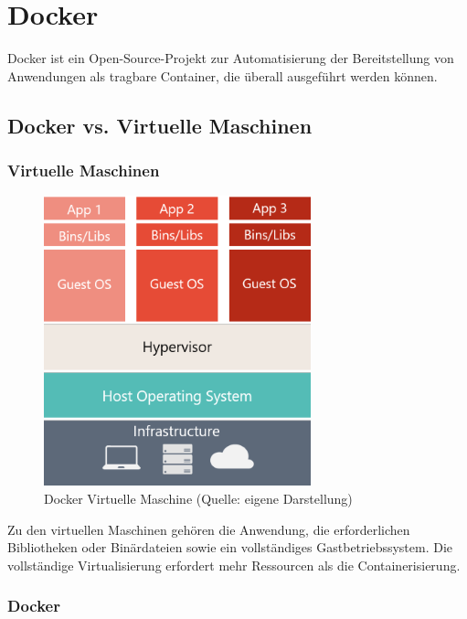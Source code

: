 \section{Docker}\label{sec:docker}

Docker ist ein Open-Source-Projekt zur Automatisierung der Bereitstellung von Anwendungen als tragbare Container, die überall ausgeführt werden können. 

\subsection{Docker vs. Virtuelle Maschinen}\label{sec:docker-vm}

\subsubsection{Virtuelle Maschinen}

\begin{figure}[H]
    \begin{center}
        \includegraphics[scale=0.8]{images/docker-vm.png}
        \caption{Docker Virtuelle Maschine (Quelle: eigene Darstellung)}
    \end{center}
\end{figure}

Zu den virtuellen Maschinen gehören die Anwendung, die erforderlichen Bibliotheken oder Binärdateien sowie ein vollständiges Gastbetriebssystem. Die vollständige Virtualisierung erfordert mehr Ressourcen als die Containerisierung. \cite{docker}

\subsubsection{Docker}

